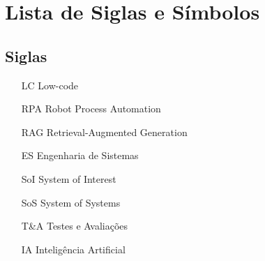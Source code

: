 
\newpage
\chapter*{Lista de Siglas e Símbolos} %

	\section*{Siglas}
	
		\begin{itemize}[labelwidth=5em,leftmargin=\dimexpr{}+\relax,align=left]
			\item[LC] Low-code
			\item[RPA] Robot Process Automation
			\item[RAG] Retrieval-Augmented Generation
			\item[ES] Engenharia de Sistemas
			\item[SoI] System of Interest
			\item[SoS] System of Systems
			\item[T\&A] Testes e Avaliações
			\item[IA] Inteligência Artificial
		\end{itemize}
	
		\thispagestyle{empty}

	
	

